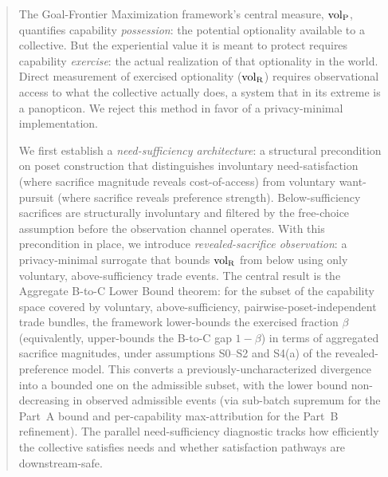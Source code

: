 \begin{abstract}
The Goal-Frontier Maximization framework's central measure, $\volL$, quantifies
    capability \emph{possession}: the potential optionality available to a
    collective. But the experiential value it is meant to protect requires
    capability \emph{exercise}: the actual realization of that optionality in
    the world. Direct measurement of exercised optionality ($\volR$) requires
    observational access to what the collective actually does, a system that in
    its extreme is a panopticon. We reject this method in favor of a
    privacy-minimal implementation.

    We first establish a \emph{need-sufficiency architecture}: a structural
    precondition on poset construction that distinguishes involuntary
    need-satisfaction (where sacrifice magnitude reveals cost-of-access) from
    voluntary want-pursuit (where sacrifice reveals preference strength).
    Below-sufficiency sacrifices are structurally involuntary and filtered by
    the free-choice assumption before the observation channel operates. With
    this precondition in place, we introduce \emph{revealed-sacrifice
    observation}: a privacy-minimal surrogate that bounds $\volR$ from below
    using only voluntary, above-sufficiency trade events. The central result is
    the Aggregate B-to-C Lower Bound theorem: for the subset of the
    capability space covered by voluntary, above-sufficiency,
    pairwise-poset-independent trade bundles, the framework lower-bounds
    the exercised fraction $\beta$ (equivalently, upper-bounds the B-to-C
    gap $1-\beta$) in terms of aggregated sacrifice magnitudes, under
    assumptions S0--S2 and S4(a) of the revealed-preference model.  This
    converts a previously-uncharacterized divergence into a bounded one
    on the admissible subset, with the lower bound non-decreasing in
    observed admissible events (via sub-batch supremum for the Part~A
    bound and per-capability max-attribution for the Part~B refinement).  The parallel need-sufficiency
    diagnostic tracks how efficiently the collective satisfies needs and
    whether satisfaction pathways are downstream-safe.
\end{abstract}
